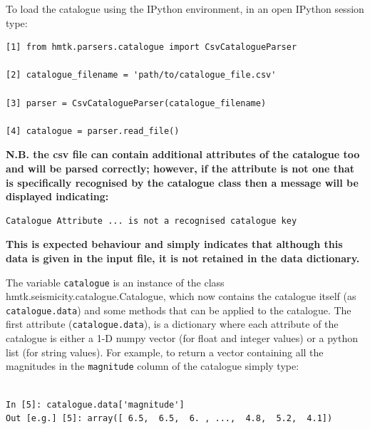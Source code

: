 To load the catalogue using the IPython environment, in an open IPython session type:

\begin{Verbatim}[frame=single, commandchars=\\\{\}, fontsize=\scriptsize, samepage=true]
[1] from hmtk.parsers.catalogue import CsvCatalogueParser

[2] catalogue_filename = 'path/to/catalogue_file.csv'

[3] parser = CsvCatalogueParser(catalogue_filename)

[4] catalogue = parser.read_file()
\end{Verbatim}

\textbf{N.B. the csv file can contain additional attributes of the catalogue too and will be parsed correctly; however, if the attribute is not one that is specifically recognised by the catalogue class then a message will be displayed indicating:}

\begin{Verbatim}[frame=single, commandchars=\\\{\}, fontsize=\scriptsize, samepage=true]
Catalogue Attribute ... is not a recognised catalogue key 
\end{Verbatim}

\textbf{This is expected behaviour and simply indicates that although this data is given in the input file, it is not retained in the data dictionary.}

The variable \verb=catalogue= is an instance of the class hmtk.seismicity.catalogue.Catalogue, which now contains the catalogue itself (as \verb=catalogue.data=) and some methods that can be applied to the catalogue. The first attribute (\verb=catalogue.data=), is a dictionary where each attribute of the catalogue is either a 1-D numpy vector (for float and integer values) or a python list (for string values). For example, to return a vector containing all the magnitudes in the \verb=magnitude= column of the catalogue simply type:

\begin{Verbatim}[frame=single, commandchars=\\\{\}, fontsize=\scriptsize, samepage=true]

In [5]: catalogue.data['magnitude']
Out [e.g.] [5]: array([ 6.5,  6.5,  6. , ...,  4.8,  5.2,  4.1])

\end{Verbatim}

